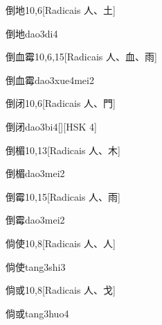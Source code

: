 \begin{entry}{倒地}{10,6}[Radicais ⼈、⼟]
  \begin{phonetics}{倒地}{dao3di4}
  \end{phonetics}
\end{entry}

\begin{entry}{倒血霉}{10,6,15}[Radicais ⼈、⾎、⾬]
  \begin{phonetics}{倒血霉}{dao3xue4mei2}
  \end{phonetics}
\end{entry}

\begin{entry}{倒闭}{10,6}[Radicais ⼈、⾨]
  \begin{phonetics}{倒闭}{dao3bi4}[][HSK 4]
  \end{phonetics}
\end{entry}

\begin{entry}{倒楣}{10,13}[Radicais ⼈、⽊]
  \begin{phonetics}{倒楣}{dao3mei2}
  \end{phonetics}
\end{entry}

\begin{entry}{倒霉}{10,15}[Radicais ⼈、⾬]
  \begin{phonetics}{倒霉}{dao3mei2}
  \end{phonetics}
\end{entry}

\begin{entry}{倘使}{10,8}[Radicais ⼈、⼈]
  \begin{phonetics}{倘使}{tang3shi3}
  \end{phonetics}
\end{entry}

\begin{entry}{倘或}{10,8}[Radicais ⼈、⼽]
  \begin{phonetics}{倘或}{tang3huo4}
  \end{phonetics}
\end{entry}


